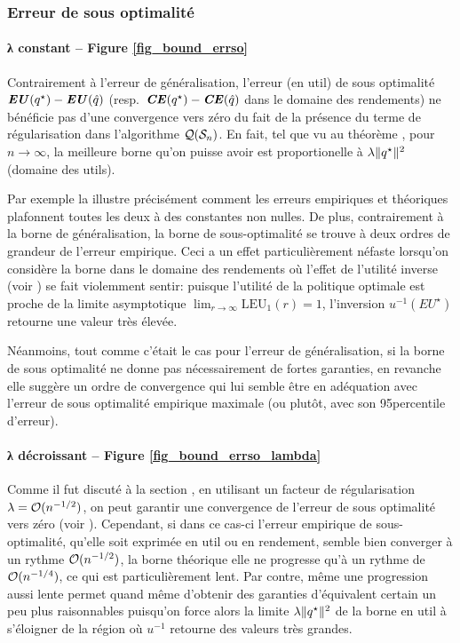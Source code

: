 \clearpage


\subsubsection{Erreur de sous optimalité}

\paragraph{λ constant -- Figure \ref{fig_bound_errso}}

Contrairement à l'erreur de généralisation, l'erreur (en util) de sous optimalité
$\operatorname{\mbox{\textbf{\textit{EU}}}}(q^\star) - \operatorname{\mbox{\textbf{\textit{EU}}}}(\hat q)$ (resp.~$\operatorname{\mbox{\textbf{\textit{CE}}}}(q^\star) - \operatorname{\mbox{\textbf{\textit{CE}}}}(\hat q)$ dans le domaine des rendements) ne
bénéficie pas d'une convergence vers zéro du fait de la présence du terme de
régularisation dans l'algorithme $\mathcal{Q}(\mathcal S_n)$. En fait, tel que vu au théorème \cit, pour
$n\to\infty$, la meilleure borne qu'on puisse avoir est proportionelle à
$\lambda\|q^\star\|^2$ (domaine des utils).

Par exemple la  illustre précisément comment les erreurs
empiriques et théoriques plafonnent toutes les deux à des constantes non nulles. De plus,
contrairement à la borne de généralisation, la borne de sous-optimalité se trouve à deux
ordres de grandeur de l'erreur empirique. Ceci a un effet particulièrement néfaste
lorsqu'on considère la borne dans le domaine des rendements où l'effet de l'utilité
inverse (voir ) se fait violemment sentir: puisque l'utilité de la
politique optimale est proche de la limite asymptotique
$\lim_{r\to\infty}\text{LEU}_1(r) = 1$, l'inversion $u^{-1}(EU^\star)$ retourne une valeur très
élevée.

Néanmoins, tout comme c'était le cas pour l'erreur de généralisation, si la borne de sous
optimalité ne donne pas nécessairement de fortes garanties, en revanche elle suggère un
ordre de convergence qui lui semble être en adéquation avec l'erreur de sous optimalité
empirique maximale (ou plutôt, avec son 95\ieme percentile d'erreur).


\paragraph{λ décroissant -- Figure \ref{fig_bound_errso_lambda}}

Comme il fut discuté à la section \cit, en utilisant un facteur de régularisation
$\lambda = \mathcal O(n^{-1/2})$, on peut garantir une convergence de l'erreur de sous optimalité
vers zéro (voir ). Cependant, si dans ce cas-ci l'erreur
empirique de sous-optimalité, qu'elle soit exprimée en util ou en rendement, semble bien
converger à un rythme $\mathcal O(n^{-1/2})$, la borne théorique elle ne progresse qu'à un
rythme de $\mathcal O(n^{-1/4})$, ce qui est particulièrement lent. Par contre, même une
progression aussi lente permet quand même d'obtenir des garanties d'équivalent certain un
peu plus raisonnables puisqu'on force alors la limite $\lambda\|q^\star\|^2$ de la borne en util à
s'éloigner de la région où $u^{-1}$ retourne des valeurs très grandes.

